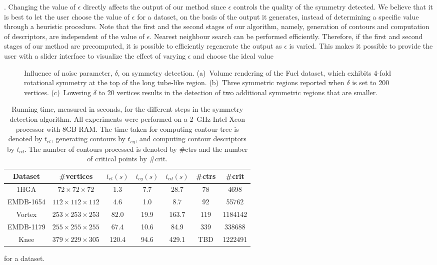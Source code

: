 \documentclass[review,journal]{vgtc}         %
\begin{document}
.
Changing the value of $\epsilon$ directly affects the output of  our method since $\epsilon$
controls the quality of the symmetry detected. We believe that it is best to let the user choose the value
of $\epsilon$ for a dataset, on the basis of the output it generates, instead of determining a specific
value through a heuristic procedure. Note that the first and the second stages of our algorithm,
namely, generation of contours and computation of descriptors, are independent of the value of 
$\epsilon$. Nearest neighbour search can be performed efficiently. Therefore, if the first and 
second stages of our method are precomputed, it is possible to efficiently regenerate the output
as $\epsilon$ is varied. This makes it possible to provide the user with a slider interface
to visualize the effect of varying $\epsilon$ and choose the ideal value 
\begin{figure}[t]
	\centering
	\caption{\label{delta}Influence of noise parameter, $\delta$, on symmetry detection. (a)~Volume rendering of 
		the Fuel dataset, which exhibits 4-fold rotational symmetry at the top of the long tube-like region.
		(b)~Three symmetric regions reported when $\delta$ is set to 200 vertices. (c)~Lowering
	$\delta$ to 20 vertices results in the detection of two additional symmetric regions that are smaller.}
\end{figure}
\begin{table}[b]
\centering
{\color{blue}
{\small
\caption{Running time, measured in seconds, for the different steps in the symmetry detection algorithm.
	All experiments were performed on a 2~GHz Intel Xeon processor with 8GB RAM. The time taken for
	computing contour tree is denoted by $t_{ct}$, generating contours by $t_{cg}$, and computing contour descriptors
	by $t_{cd}$. The number of contours processed is denoted by \#ctrs and the number of critical points by \#crit.}
\label{exp-table}
\begin{tabular}{c||c|c|c|c|c|c}
	Dataset		&\#vertices 			&$t_{ct} (s)$	&$t_{cg} (s)$	&$t_{cd} (s)$	&\#ctrs	&\#crit\\
\hline
1HGA	 	&$72\times72\times72$ 		&1.3 		&7.7 		&28.7       	&78	&4698\\
EMDB-1654 	&$112\times112\times112$ 	&4.6 		&1.0		&8.7      	&92	&55762\\ 
Vortex		&$253\times253\times253$	&82.0	 	&19.9		&163.7		&119	&1184142\\
EMDB-1179 	&$255\times255\times255$ 	&67.4		&10.6		&84.9     	&339	&338688\\ 
Knee 		&$379\times229\times305$ 	&120.4		&94.6		&429.1		&TBD	&1222491 
\end{tabular}
}
}
\end{table}
for a dataset.
\end{document}
